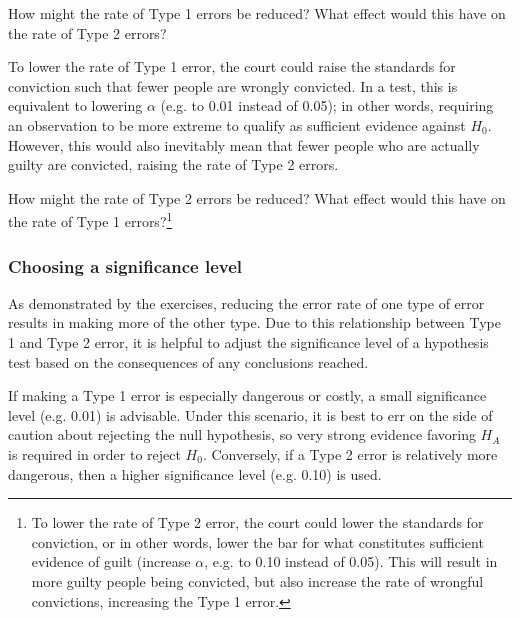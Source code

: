 \begin{spacing}{1.5}
\begin{example}{How might the rate of Type 1 errors be reduced? What effect would this have on the rate of Type 2 errors?}
	
	To lower the rate of Type 1 error, the court could raise the standards for conviction such that fewer people are wrongly convicted. In a test, this is equivalent to lowering $\alpha$ (e.g. to 0.01 instead of 0.05); in other words, requiring an observation to be more extreme to qualify as sufficient evidence against $H_0$. However, this would also inevitably mean that fewer people who are actually guilty are convicted, raising the rate of Type 2 errors.
\end{example}

\begin{exercise} \label{howToReduceType2ErrorsInUSCourts}
	How might the rate of Type 2 errors be reduced? What effect would this have on the rate of Type 1 errors?\footnote{To lower the rate of Type 2 error, the court could lower the standards for conviction, or in other words, lower the bar for what constitutes sufficient evidence of guilt (increase $\alpha$, e.g. to 0.10 instead of 0.05). This will result in more guilty people being convicted, but also increase the rate of wrongful convictions, increasing the Type 1 error.}
\end{exercise}


\subsubsection{Choosing a significance level}

As demonstrated by the exercises, reducing the error rate of one type of error results in making more of the other type. Due to this relationship between Type 1 and Type 2 error, it is helpful to adjust the significance level of a hypothesis test based on the consequences of any conclusions reached.

\label{significanceLevel}


If making a Type 1 error is especially dangerous or costly, a small significance level (e.g. 0.01) is advisable. Under this scenario, it is best to err on the side of caution about rejecting the null hypothesis, so very strong evidence favoring $H_A$ is required in order to reject $H_0$. Conversely, if a Type 2 error is relatively more dangerous, then a higher significance level (e.g. 0.10) is used. 


\end{spacing}

